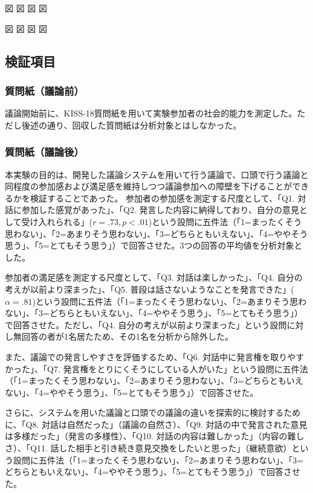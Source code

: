 \documentclass[11pt, a4paper]{jreport} %
\begin{document}
図
図
図
図


図
図
図
図



\subsection{検証項目}


\subsubsection*{質問紙（議論前）}
議論開始前に、KISS-18\cite{1988思いやりを科学する}質問紙を用いて実験参加者の社会的能力を測定した。ただし後述の通り、回収した質問紙は分析対象とはしなかった。

\subsubsection*{質問紙（議論後）}

本実験の目的は、開発した議論システムを用いて行う議論で、口頭で行う議論と同程度の参加感および満足感を維持しつつ議論参加への障壁を下げることができるかを検証することであった。
参加者の参加感を測定する尺度として、「Q1. 対話に参加した感覚があった」、「Q2. 発言した内容に納得しており、自分の意見として受け入れられる」($r=.73, p<.01$)という設問に五件法（「1=まったくそう思わない」、「2=あまりそう思わない」、「3=どちらともいえない」、「4=ややそう思う」、「5=とてもそう思う」）で回答させた。3つの回答の平均値を分析対象とした。

参加者の満足感を測定する尺度として、「Q3. 対話は楽しかった」、「Q4. 自分の考えが以前より深まった」、「Q5. 普段は話さないようなことを発言できた」($\alpha =.81$)という設問に五件法（「1=まったくそう思わない」、「2=あまりそう思わない」、「3=どちらともいえない」、「4=ややそう思う」、「5=とてもそう思う」）で回答させた。ただし、「Q4. 自分の考えが以前より深まった」という設問に対し無回答の者が1名居たため、その1名を分析から除外した。


また、議論での発言しやすさを評価するため、「Q6. 対話中に発言権を取りやすかった」、「Q7. 発言権をとりにくそうにしている人がいた」という設問に五件法（「1=まったくそう思わない」、「2=あまりそう思わない」、「3=どちらともいえない」、「4=ややそう思う」、「5=とてもそう思う」）で回答させた。



さらに、システムを用いた議論と口頭での議論の違いを探索的に検討するために、「Q8. 対話は自然だった」（議論の自然さ）、「Q9. 対話の中で発言された意見は多様だった」（発言の多様性）、「Q10. 対話の内容は難しかった」（内容の難しさ）、「Q11. 話した相手と引き続き意見交換をしたいと思った」（継続意欲）という設問に五件法（「1=まったくそう思わない」、「2=あまりそう思わない」、「3=どちらともいえない」、「4=ややそう思う」、「5=とてもそう思う」）で回答させた。
\end{document}
